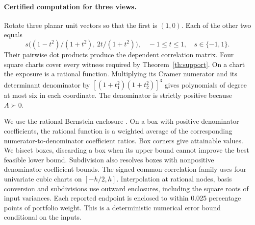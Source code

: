 \paragraph{Certified computation for three views.}
Rotate three planar unit vectors so that the first is $(1,0)$. Each of the other two equals
\[
 s\big((1-t^2)/(1+t^2),\,2t/(1+t^2)\big),\quad -1\le t\le1,\quad s\in\{-1,1\}.
\]
Their pairwise dot products produce the dependent correlation matrix. Four square charts cover every witness required by Theorem~\ref{th:support}. On a chart the exposure is a rational function. Multiplying its Cramer numerator and its determinant denominator by $[(1+t_1^2)(1+t_2^2)]^3$ gives polynomials of degree at most six in each coordinate. The denominator is strictly positive because $A\succ0$.

We use the rational Bernstein enclosure \cite{bernstein}. On a box with positive denominator coefficients, the rational function is a weighted average of the corresponding numerator-to-denominator coefficient ratios. Box corners give attainable values. We bisect boxes, discarding a box when its upper bound cannot improve the best feasible lower bound. Subdivision also resolves boxes with nonpositive denominator coefficient bounds. The signed common-correlation family uses four univariate cubic charts on $[-h/2,h]$. Interpolation at rational nodes, basis conversion and subdivisions use outward enclosures, including the square roots of input variances. Each reported endpoint is enclosed to within 0.025 percentage points of portfolio weight. This is a deterministic numerical error bound conditional on the inputs.
